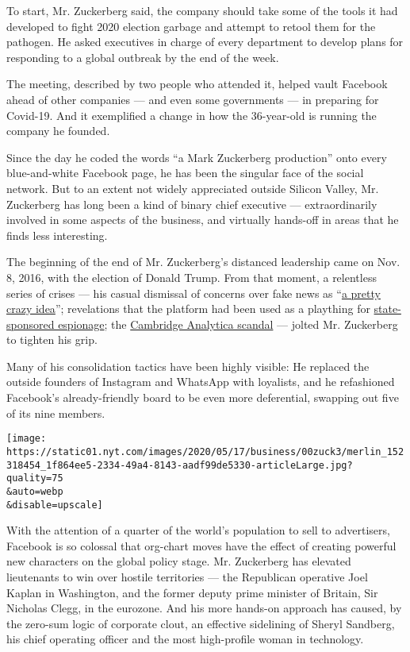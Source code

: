 To start, Mr. Zuckerberg said, the company should take some of the tools
it had developed to fight 2020 election garbage and attempt to retool
them for the pathogen. He asked executives in charge of every department
to develop plans for responding to a global outbreak by the end of the
week.

The meeting, described by two people who attended it, helped vault
Facebook ahead of other companies --- and even some governments --- in
preparing for Covid-19. And it exemplified a change in how the
36-year-old is running the company he founded.

Since the day he coded the words ``a Mark Zuckerberg production'' onto
every blue-and-white Facebook page, he has been the singular face of the
social network. But to an extent not widely appreciated outside Silicon
Valley, Mr. Zuckerberg has long been a kind of binary chief executive
--- extraordinarily involved in some aspects of the business, and
virtually hands-off in areas that he finds less interesting.

The beginning of the end of Mr. Zuckerberg's distanced leadership came
on Nov. 8, 2016, with the election of Donald Trump. From that moment, a
relentless series of crises --- his casual dismissal of concerns over
fake news as
``\href{https://www.theguardian.com/technology/2016/nov/10/facebook-fake-news-us-election-mark-zuckerberg-donald-trump}{a
pretty crazy idea}''; revelations that the platform had been used as a
plaything for
\href{https://www.nytimes.com/2017/09/07/us/politics/russia-facebook-twitter-election.html}{state-sponsored
espionage}; the
\href{https://www.nytimes.com/2018/04/04/us/politics/cambridge-analytica-scandal-fallout.html}{Cambridge
Analytica scandal} --- jolted Mr. Zuckerberg to tighten his grip.

Many of his consolidation tactics have been highly visible: He replaced
the outside founders of Instagram and WhatsApp with loyalists, and he
refashioned Facebook's already-friendly board to be even more
deferential, swapping out five of its nine members.

\texttt{[image: https://static01.nyt.com/images/2020/05/17/business/00zuck3/merlin\_152318454\_1f864ee5-2334-49a4-8143-aadf99de5330-articleLarge.jpg?quality=75\\\&auto=webp\\\&disable=upscale]}

With the attention of a quarter of the world's population to sell to
advertisers, Facebook is so colossal that org-chart moves have the
effect of creating powerful new characters on the global policy stage.
Mr. Zuckerberg has elevated lieutenants to win over hostile territories
--- the Republican operative Joel Kaplan in Washington, and the former
deputy prime minister of Britain, Sir Nicholas Clegg, in the eurozone.
And his more hands-on approach has caused, by the zero-sum logic of
corporate clout, an effective sidelining of Sheryl Sandberg, his chief
operating officer and the most high-profile woman in technology.

